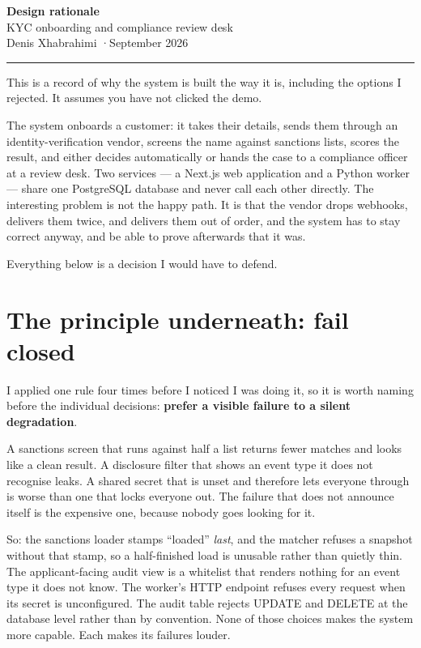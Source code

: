 \documentclass[11pt,a4paper]{article}
\begin{document}
\begin{flushleft}
{\LARGE\bfseries Design rationale}\\[0.35em]
{\large KYC onboarding and compliance review desk}\\[0.6em]
{\normalsize Denis Xhabrahimi \quad·\quad September 2026}
\end{flushleft}
\rule{\textwidth}{0.4pt}

\vspace{0.6em}

This is a record of why the system is built the way it is, including the
options I rejected. It assumes you have not clicked the demo.

The system onboards a customer: it takes their details, sends them through an
identity-verification vendor, screens the name against sanctions lists, scores
the result, and either decides automatically or hands the case to a compliance
officer at a review desk. Two services --- a Next.js web application and a
Python worker --- share one PostgreSQL database and never call each other
directly. The interesting problem is not the happy path. It is that the vendor
drops webhooks, delivers them twice, and delivers them out of order, and the
system has to stay correct anyway, and be able to prove afterwards that it was.

Everything below is a decision I would have to defend.

\section{The principle underneath: fail closed}

I applied one rule four times before I noticed I was doing it, so it is worth
naming before the individual decisions: \textbf{prefer a visible failure to a
silent degradation}.

A sanctions screen that runs against half a list returns fewer matches and looks
like a clean result. A disclosure filter that shows an event type it does not
recognise leaks. A shared secret that is unset and therefore lets everyone
through is worse than one that locks everyone out. The failure that does not
announce itself is the expensive one, because nobody goes looking for it.

So: the sanctions loader stamps ``loaded'' \emph{last}, and the matcher refuses
a snapshot without that stamp, so a half-finished load is unusable rather than
quietly thin. The applicant-facing audit view is a whitelist that renders
nothing for an event type it does not know. The worker's HTTP endpoint refuses
every request when its secret is unconfigured. The audit table rejects UPDATE
and DELETE at the database level rather than by convention. None of those
choices makes the system more capable. Each makes its failures louder.
\end{document}
